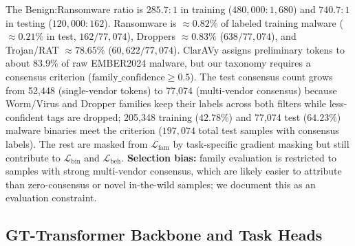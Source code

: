 \documentclass[Number]{sn-jnl}
\begin{document}
The Benign:Ransomware ratio is $285.7:1$ in training ($480{,}000:1{,}680$) and $740.7:1$ in testing ($120{,}000:162$). Ransomware is $\approx0.82\%$ of labeled training malware ($\approx0.21\%$ in test, $162/77{,}074$), Droppers $\approx0.83\%$ ($638/77{,}074$), and Trojan/RAT $\approx78.65\%$ ($60{,}622/77{,}074$). ClarAVy assigns preliminary tokens to about $83.9\%$ of raw EMBER2024 malware, but our taxonomy requires a consensus criterion ($\text{family\_confidence}\ge0.5$). The test consensus count grows from 52,448 (single-vendor tokens) to 77,074 (multi-vendor consensus) because Worm/Virus and Dropper families keep their labels across both filters while less-confident tags are dropped; 205{,}348 training ($42.78\%$) and 77{,}074 test ($64.23\%$) malware binaries meet the criterion ($197{,}074$ total test samples with consensus labels). The rest are masked from $\mathcal{L}_\text{fam}$ by task-specific gradient masking but still contribute to $\mathcal{L}_\text{bin}$ and $\mathcal{L}_\text{beh}$. \textbf{Selection bias:} family evaluation is restricted to samples with strong multi-vendor consensus, which are likely easier to attribute than zero-consensus or novel in-the-wild samples; we document this as an evaluation constraint.

\subsection{GT-Transformer Backbone and Task Heads}\label{subsec:core}
\end{document}

